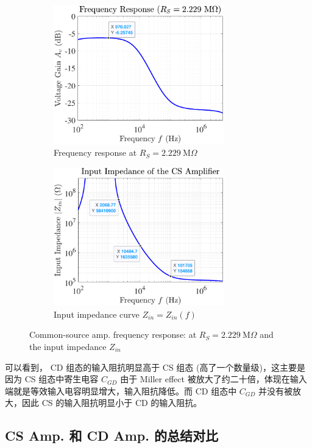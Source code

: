 \documentclass[UTF8]{article}
\begin{document}
\vspace*{-3mm}
\begin{figure}[H]\centering
\begin{subfigure}[b]{0.5\columnwidth}\centering
    \includegraphics[width=210pt]{LCE-04-场效应管/assets/cd amp/cd gain, R_S = 2M229.pdf}\hspace*{8mm}
    \caption{Frequency response at $R_S = 2.229 \ \mathrm{M}\Omega$}
\end{subfigure}\hfill
\begin{subfigure}[b]{0.5\columnwidth}\centering
    \includegraphics[width=210pt]{LCE-04-场效应管/assets/cd amp/cd Z_in.pdf}
    \hspace*{8mm}
    \caption{Input impedance curve $Z_{in} = Z_{in}(f)$}
\end{subfigure}
\caption{Common-source amp. frequency response:  at $R_S = 2.229 \ \mathrm{M}\Omega$ and the input impedance $Z_{in}$}
\end{figure}

可以看到， CD 组态的输入阻抗明显高于 CS 组态 (高了一个数量级)，这主要是因为 CS 组态中寄生电容 $C_{GD}$ 由于 Miller effect 被放大了约二十倍，体现在输入端就是等效输入电容明显增大，输入阻抗降低。而 CD 组态中 $C_{GD}$ 并没有被放大，因此 CS 的输入阻抗明显小于 CD 的输入阻抗。

\subsection{CS Amp. 和 CD Amp. 的总结对比}
\end{document}
